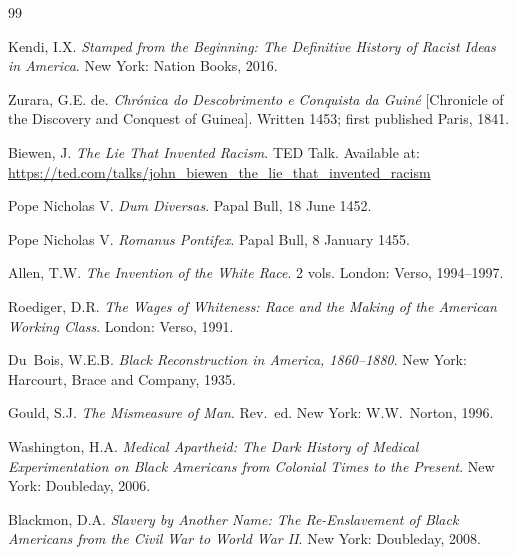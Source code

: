 \documentclass[12pt]{article}
\begin{document}
\begin{thebibliography}{99}


Kendi, I.X. \textit{Stamped from the Beginning: The Definitive History of Racist Ideas in America}. New York: Nation Books, 2016.

Zurara, G.E. de. \textit{Chr\'{o}nica do Descobrimento e Conquista da Guin\'{e}} [Chronicle of the Discovery and Conquest of Guinea]. Written 1453; first published Paris, 1841.

Biewen, J. \textit{The Lie That Invented Racism}. TED Talk. Available at: \url{https://ted.com/talks/john_biewen_the_lie_that_invented_racism}


Pope Nicholas V. \textit{Dum Diversas}. Papal Bull, 18 June 1452.

Pope Nicholas V. \textit{Romanus Pontifex}. Papal Bull, 8 January 1455.


Allen, T.W. \textit{The Invention of the White Race}. 2 vols. London: Verso, 1994--1997.

Roediger, D.R. \textit{The Wages of Whiteness: Race and the Making of the American Working Class}. London: Verso, 1991.

Du~Bois, W.E.B. \textit{Black Reconstruction in America, 1860--1880}. New York: Harcourt, Brace and Company, 1935.


Gould, S.J. \textit{The Mismeasure of Man}. Rev.\ ed. New York: W.W.\ Norton, 1996.

Washington, H.A. \textit{Medical Apartheid: The Dark History of Medical Experimentation on Black Americans from Colonial Times to the Present}. New York: Doubleday, 2006.


Blackmon, D.A. \textit{Slavery by Another Name: The Re-Enslavement of Black Americans from the Civil War to World War II}. New York: Doubleday, 2008.


\end{thebibliography}
\end{document}
